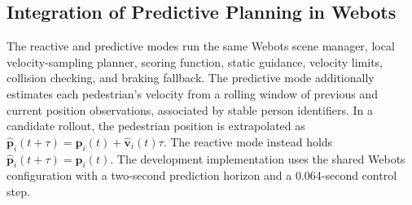 \subsection{Integration of Predictive Planning in Webots}
The reactive and predictive modes run the same Webots scene manager,
local velocity-sampling planner, scoring function, static guidance,
velocity limits, collision checking, and braking fallback.
The predictive mode additionally estimates each pedestrian's velocity
from a rolling window of previous and current position observations,
associated by stable person identifiers. In a candidate rollout,
the pedestrian position is extrapolated as
\(\hat{\mathbf p}_i(t+\tau)=\mathbf p_i(t)+\hat{\mathbf v}_i(t)\tau\).
The reactive mode instead holds \(\hat{\mathbf p}_i(t+\tau)=\mathbf p_i(t)\).
The development implementation uses the shared Webots configuration
with a two-second prediction horizon and a 0.064-second control step.
